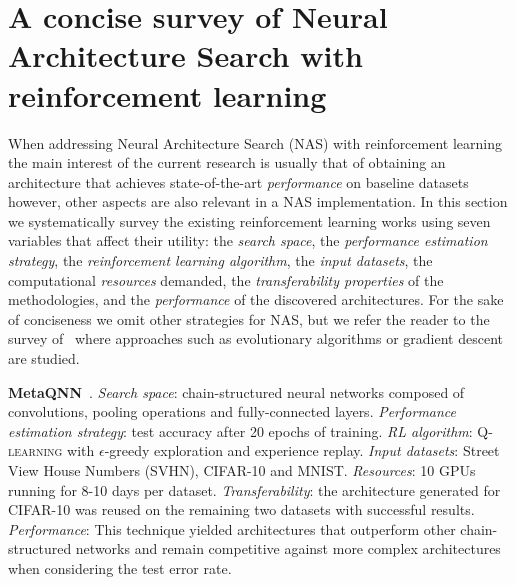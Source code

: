 \section{A concise survey of Neural Architecture Search with reinforcement learning}\label{app:related}

When addressing Neural Architecture Search (NAS) with reinforcement learning the main interest of the current research is usually that of obtaining an architecture that achieves state-of-the-art \textit{performance} on baseline datasets however, other aspects are also relevant in a NAS implementation. In this section we systematically survey the existing reinforcement learning works using seven variables that affect their utility: the \textit{search space}, the \textit{performance estimation strategy}, the \textit{reinforcement learning algorithm}, the \textit{input datasets}, the computational \textit{resources} demanded, the \textit{transferability properties} of the methodologies, and the \textit{performance} of the discovered architectures. For the sake of conciseness we omit other strategies for NAS, but we refer the reader to the survey of~\citet{NASsurvey} where approaches such as evolutionary algorithms or gradient descent are studied.




\hspace{\parindent} \textbf{MetaQNN}~\citep{BakerNAS}. \emph{Search space}: chain-structured neural networks composed of convolutions, pooling operations and fully-connected layers. \emph{Performance estimation strategy}: test accuracy after 20 epochs of training. \emph{RL algorithm}: \textsc{Q-learning} with $\epsilon$-greedy exploration and experience replay. \emph{Input datasets}: Street View House Numbers (SVHN), CIFAR-10 and MNIST. \emph{Resources}: 10 GPUs running for 8-10 days per dataset. \emph{Transferability}: the architecture generated for CIFAR-10 was reused on the remaining two datasets with successful results. \emph{Performance}: This technique yielded architectures that outperform other chain-structured networks and remain competitive against more complex architectures when considering the test error rate.


